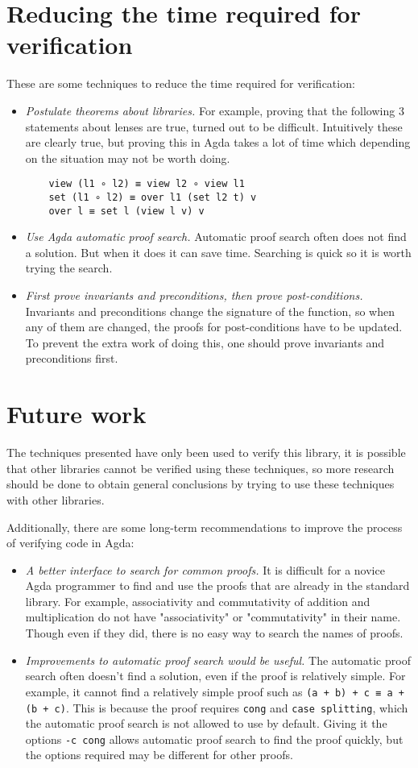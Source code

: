 \section{Reducing the time required for verification}
These are some techniques to reduce the time required for verification:
\begin{itemize}
    \item \textit{Postulate theorems about libraries.} For example, proving that the following 3 statements about lenses are true, turned out to be difficult. Intuitively these are clearly true, but proving this in Agda takes a lot of time which depending on the situation may not be worth doing. 
    \begin{verbatim}
    view (l1 ∘ l2) ≡ view l2 ∘ view l1
    set (l1 ∘ l2) ≡ over l1 (set l2 t) v
    over l ≡ set l (view l v) v
    \end{verbatim}
    \item \textit{Use Agda automatic proof search.} Automatic proof search often does not find a solution. But when it does it can save time. Searching is quick so it is worth trying the search.
    \item \textit{First prove invariants and preconditions, then prove post-conditions.} Invariants and preconditions change the signature of the function, so when any of them are changed, the proofs for post-conditions have to be updated. To prevent the extra work of doing this, one should prove invariants and preconditions first.
\end{itemize}

\section{Future work}
The techniques presented have only been used to verify this library, it is possible that other libraries cannot be verified using these techniques, so more research should be done to obtain general conclusions by trying to use these techniques with other libraries. 

Additionally, there are some long-term recommendations to improve the process of verifying code in Agda:
\begin{itemize}
	\item \textit{A better interface to search for common proofs.} It is difficult for a novice Agda programmer to find and use the proofs that are already in the standard library. For example, associativity and commutativity of addition and multiplication do not have "associativity" or "commutativity" in their name. Though even if they did, there is no easy way to search the names of proofs.
	\item \textit{Improvements to automatic proof search would be useful.} The automatic proof search often doesn't find a solution, even if the proof is relatively simple. For example, it cannot find a relatively simple proof such as \verb|(a + b) + c ≡ a + (b + c)|. This is because the proof requires \verb|cong|  and \verb|case splitting|, which the automatic proof search is not allowed to use by default. Giving it the options \verb|-c cong| allows automatic proof search to find the proof quickly, but the options required may be different for other proofs.
\end{itemize}

